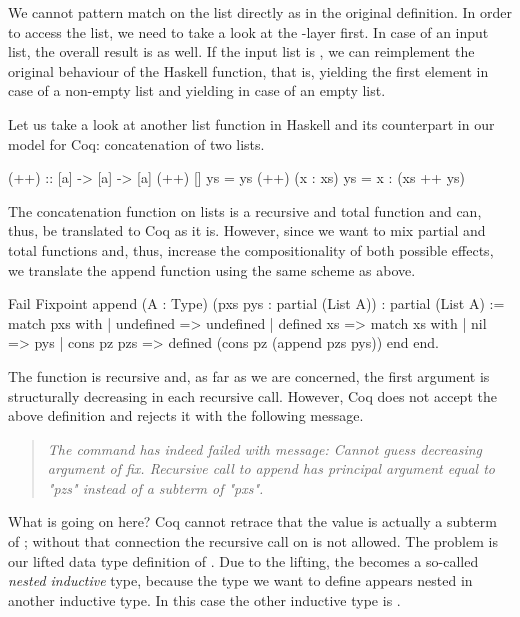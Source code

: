 We cannot pattern match on the list directly as in the original definition.
In order to access the list, we need to take a look at the \--layer first.
In case of an  input list, the overall result is  as well.
If the input list is , we can reimplement the original behaviour of the Haskell function, that is, yielding the first element in case of a non\--empty list and yielding  in case of an empty list.

Let us take a look at another list function in Haskell and its counterpart in our model for Coq: concatenation of two lists.

\begin{haskellcode}
(++) :: [a] -> [a] -> [a]
(++) []       ys = ys
(++) (x : xs) ys = x : (xs ++ ys)
\end{haskellcode}

The concatenation function on lists is a recursive and total function and can, thus, be translated to Coq as it is.
However, since we want to mix partial and total functions and, thus, increase the compositionality of both possible effects, we translate the append function using the same scheme as above.

\begin{coqcode}
Fail Fixpoint append (A : Type) (pxs pys : partial (List A))
  : partial (List A) :=
  match pxs with
  | undefined  => undefined
  | defined xs => match xs with
                 | nil         => pys
                 | cons pz pzs => defined (cons pz (append pzs pys))
                 end
  end.
\end{coqcode}

The function  is recursive and, as far as we are concerned, the first argument is structurally decreasing in each
recursive call.
However, Coq does not accept the above definition and rejects it with the following message.

\begin{quote}
\emph{The command has indeed failed with message: Cannot guess decreasing
argument of fix.
Recursive call to append has principal argument equal to "pzs" instead of a subterm of "pxs".}
\end{quote}

What is going on here?
Coq cannot retrace that the value  is actually a subterm of ; without that connection the recursive call on  is not allowed.
The problem is our lifted data type definition of
.
Due to the lifting, the  becomes a so\--called \emph{nested inductive} type, because the type we want to define
appears nested in another inductive type.
In this case the other inductive type is .

